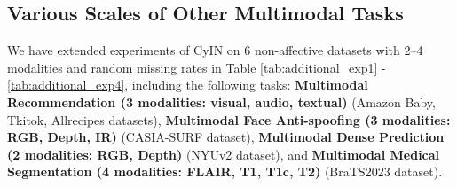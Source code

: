 \documentclass{article}
\begin{document}
\begin{table}[htbp]
\centering
\caption{Comparison of the proposed CyIN using different sizes of language models on MOSI dataset, under both complete and randomly incomplete multimodal learning settings.}
\label{table_different_lm}
\end{table}

\subsection{Various Scales of Other Multimodal Tasks}
We have extended experiments of CyIN on 6 non-affective datasets with 2–4 modalities and random missing rates in Table \ref{tab:additional_exp1} - \ref{tab:additional_exp4}, including the following tasks: \textbf{Multimodal Recommendation (3 modalities: visual, audio, textual)} \cite{li2025generating} (Amazon Baby, Tkitok, Allrecipes datasets), \textbf{Multimodal Face Anti-spoofing (3 modalities: RGB, Depth, IR) }\cite{wei2024robust} (CASIA-SURF dataset), \textbf{Multimodal Dense Prediction (2 modalities: RGB, Depth) } \cite{wei2024robust} (NYUv2 dataset), and \textbf{Multimodal Medical Segmentation (4 modalities: FLAIR, T1, T1c, T2)} \cite{pipoli2025imfuse} (BraTS2023 dataset). 
\end{document}

